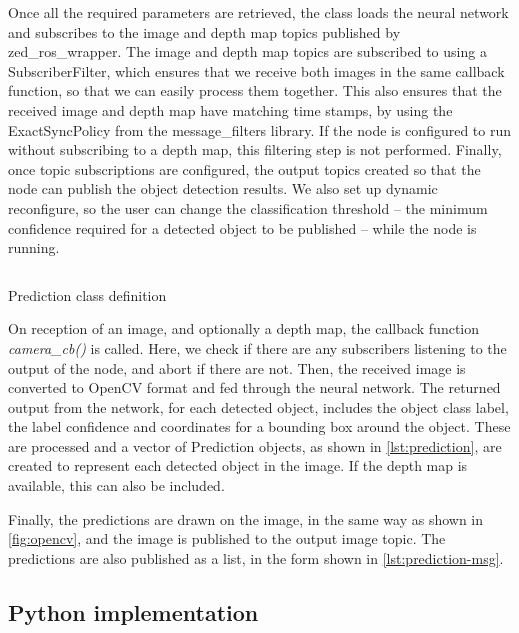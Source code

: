 \documentclass[\rootfolder/main.tex]{subfiles}
\begin{document}
Once all the required parameters are retrieved, the class loads the neural network and subscribes to the image and depth map topics published by zed\_ros\_wrapper.
The image and depth map topics are subscribed to using a SubscriberFilter, which ensures that we receive both images in the same callback function, so that we can easily process them together.
This also ensures that the received image and depth map have matching time stamps, by using the ExactSyncPolicy from the message\_filters library.
If the node is configured to run without subscribing to a depth map, this filtering step is not performed.
Finally, once topic subscriptions are configured, the output topics created so that the node can publish the object detection results.
We also set up dynamic reconfigure, so the user can change the classification threshold -- the minimum confidence required for a detected object to be published -- while the node is running.

\begin{listing}
    \inputminted{cpp}{\rootfolder/Chapters/Chapter5/Listings/Prediction}
    \caption{Prediction class definition\label{lst:prediction}}
\end{listing}

On reception of an image, and optionally a depth map, the callback function \emph{camera\_cb()} is called.
Here, we check if there are any subscribers listening to the output of the node, and abort if there are not.
Then, the received image is converted to OpenCV format and fed through the neural network.
The returned output from the network, for each detected object, includes the object class label, the label confidence and coordinates for a bounding box around the object.
These are processed and a vector of Prediction objects, as shown in \cref{lst:prediction}, are created to represent each detected object in the image.
If the depth map is available, this can also be included.

Finally, the predictions are drawn on the image, in the same way as shown in \cref{fig:opencv}, and the image is published to the output image topic.
The predictions are also published as a list, in the form shown in \cref{lst:prediction-msg}.


\subsection{Python implementation}
\end{document}
